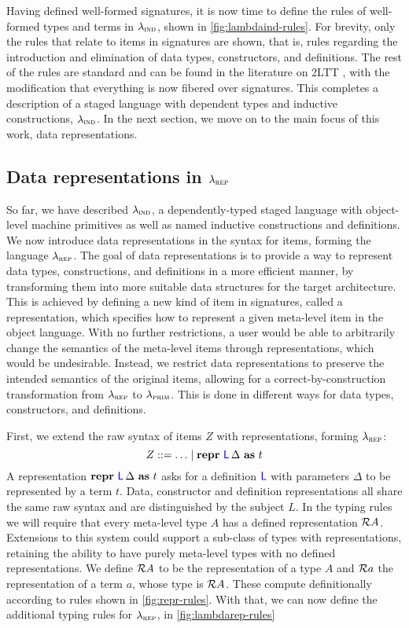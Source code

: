 Having defined well-formed signatures, it is now time to define the rules of
well-formed types and terms in $\lambda_{\textsc{ind}}$, shown in
\cref{fig:lambdaind-rules}. For brevity, only the rules that relate to items in
signatures are shown, that is, rules regarding the introduction and elimination
of data types, constructors, and definitions. The rest of the rules are
standard and can be found in the literature on 2LTT \cite{Kovacs2022-vb}, with
the modification that everything is now fibered over signatures. This completes
a description of a staged language with dependent types and inductive
constructions, $\lambda_{\textsc{ind}}$. In the next section, we move on to the main focus
of this work, data representations.

\subsection{Data representations in $\lambda_{\textsc{rep}}$}\label{sub:lambdarep}

So far, we have described $\lambda_{\textsc{ind}}$, a dependently-typed staged language
with object-level machine primitives as well as named inductive constructions
and definitions. We now introduce data representations in the syntax for items,
forming the language $\lambda_{\textsc{rep}}$. The goal of data representations is to
provide a way to represent data types, constructions, and definitions in a more
efficient manner, by transforming them into more suitable data structures for
the target architecture. This is achieved by defining a new kind of item in
signatures, called a representation, which specifies how to represent a given
meta-level item in the object language. With no further restrictions, a user
would be able to arbitrarily change the semantics of the meta-level items
through representations, which would be undesirable. Instead, we restrict data
representations to preserve the intended semantics of the original items,
allowing for a correct-by-construction transformation from $\lambda_{\textsc{rep}}$ to
$\lambda_{\textsc{prim}}$. This is done in different ways for data types, constructors, and
definitions.

First, we extend the raw syntax of items $Z$ with representations, forming
$\lambda_{\textsc{rep}}$:
\[
  Z ::= \ldots \mid \textbf{repr} \ {\color{blue}{\mathsf{L}}}\, {\Delta}\ \textbf{as}\ {t}
\]
A representation $\textbf{repr} \ {\color{blue}{\mathsf{L}}}\, {\Delta}\ \textbf{as}\ {t}$ asks for a definition ${\color{blue}{\mathsf{L}}}$ with
parameters $\Delta$ to be represented by a term $t$. Data, constructor and
definition representations all share the same raw syntax and are distinguished
by the subject $L$. In the typing rules we will require that every meta-level
type $A$ has a defined representation $\mathcal{R} {A}$. Extensions to this system
could support a sub-class of types with representations, retaining the ability
to have purely meta-level types with no defined representations. We define
$\mathcal{R} {A}$ to be the representation of a type $A$ and $\mathcal{R} {a}$ the
representation of a term $a$, whose type is $\mathcal{R} {A}$. These compute
definitionally according to rules shown in \cref{fig:repr-rules}. With that, we
can now define the additional typing rules for $\lambda_{\textsc{rep}}$, in
\cref{fig:lambdarep-rules}

